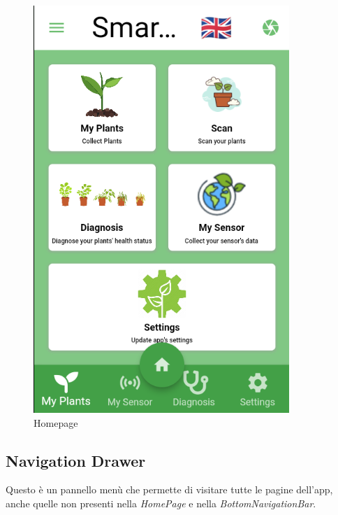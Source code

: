 \documentclass[a4paper,12pt]{report}
\begin{document}
\begin{figure}[ht] 
	\centering
	\includegraphics[width=.5\textwidth, height=.5\textheight, keepaspectratio]{./images/home/home_screen.png}
	\caption{Homepage}
	\label{fig:homepage}
\end{figure}

\subsection{Navigation Drawer}


\textsf{\small Questo è un pannello menù che permette di visitare tutte le pagine dell'app, anche quelle non presenti nella \emph{HomePage} e nella \emph{BottomNavigationBar}.}
\end{document}
